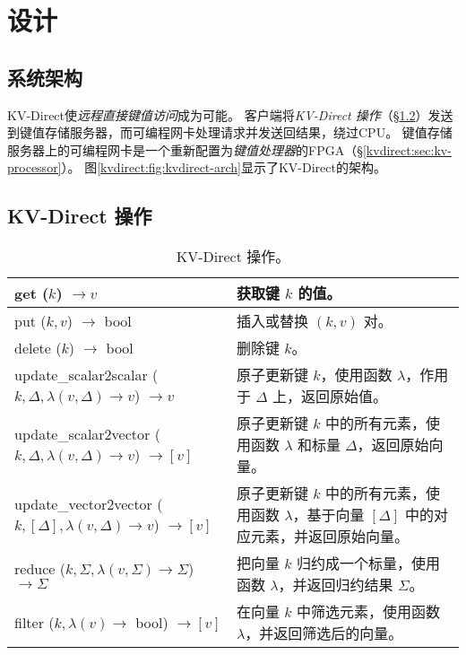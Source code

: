 \section{设计}
\label{kvdirect:sec:architecture}

\subsection{系统架构}

KV-Direct使\textit {远程直接键值访问}成为可能。
客户端将\textit {KV-Direct 操作}（\S \ref {kvdirect:sec:kv-operations}）发送到键值存储服务器，而可编程网卡处理请求并发送回结果，绕过CPU。
键值存储服务器上的可编程网卡是一个重新配置为\textit {键值处理器}的FPGA（\S \ref {kvdirect:sec:kv-processor}）。
图\ref {kvdirect:fig:kvdirect-arch}显示了KV-Direct的架构。

\subsection{KV-Direct 操作}
\label{kvdirect:sec:kv-operations}

\begin{table}
\centering
\caption{KV-Direct 操作。}
\label{kvdirect:tab:kv-operations}

\small
\begin{tabular}{p{}|p{} }
\toprule
get ($k$) $\rightarrow v$ & 获取键 $k$ 的值。 \\
\midrule
put ($k, v$) $\rightarrow$ bool & 插入或替换 $(k, v)$ 对。 \\
\midrule
delete ($k$) $\rightarrow$ bool & 删除键 $k$。 \\
\midrule
\midrule
update{\_}scalar2scalar ($k, \Delta, \lambda(v, \Delta) \rightarrow v$) $\rightarrow v$ & 原子更新键 $k$，使用函数 $\lambda$，作用于 $\Delta$ 上，返回原始值。\\
\midrule
update{\_}scalar2vector ($k, \Delta, \lambda(v, \Delta) \rightarrow v$) $\rightarrow [v]$ & 原子更新键 $k$ 中的所有元素，使用函数 $\lambda$ 和标量 $\Delta$，返回原始向量。 \\
\midrule
update{\_}vector2vector ($k, [\Delta], \lambda(v, \Delta) \rightarrow v$) $\rightarrow [v]$ & 原子更新键 $k$ 中的所有元素，使用函数 $\lambda$，基于向量 $[\Delta]$ 中的对应元素，并返回原始向量。 \\
\midrule
reduce ($k, \Sigma, \lambda(v, \Sigma) \rightarrow \Sigma$) $\rightarrow \Sigma$ & 把向量 $k$ 归约成一个标量，使用函数 $\lambda$，并返回归约结果 $\Sigma$。 \\
\midrule
filter ($k, \lambda(v) \rightarrow$ bool) $\rightarrow [v]$ & 在向量 $k$ 中筛选元素，使用函数 $\lambda$，并返回筛选后的向量。 \\
\bottomrule
\end{tabular}

\end{table}

